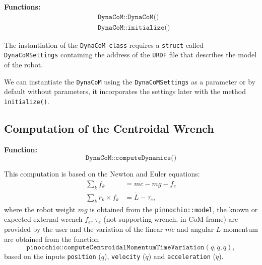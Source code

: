 \documentclass[12pt]{article}
\begin{document}
    {\bf Functions:}
    \begin{align*}
        &\texttt{DynaCoM::DynaCoM()}\\
        &\texttt{DynaCoM::initialize()}
    \end{align*}

    The instantiation of the \texttt{DynaCoM class} requires a \texttt{struct} called \texttt{DynaCoMSettings} containing the address of the \texttt{URDF} file that describes the model of the robot.

    We can instantiate the \texttt{DynaCoM} using the \texttt{DynaCoMSettings} as a parameter or by default without parameters, it incorporates the settings later with the method \texttt{initialize()}.
    



\clearpage

\subsection{Computation of the Centroidal Wrench}

\hrulefill

{\bf Function:}
%
\begin{equation*}
    \texttt{DynaCoM::computeDynamics()}
\end{equation*}

This computation is based on the Newton and Euler equations:
%
\begin{align}
    \sum_k f_k &= m\ddot{c} - m g - f_e \\
    \sum_k r_k\times f_k &= \dot{L} -\tau_e,
\end{align}
%
where the robot weight $m g$ is obtained from the \texttt{pinnochio::model}, the known or expected external wrench $f_e$, $\tau_e$ (not supporting wrench, in CoM frame) are provided by the user and the variation of the linear $m\ddot{c}$ and angular $\dot{L}$ momentum are obtained from the function 
%
\begin{equation*}
    \texttt{pinocchio::computeCentroidalMomentumTimeVariation}(q, \dot{q}, \ddot{q}),
\end{equation*}
%
based on the inputs \texttt{position} ($q$), \texttt{velocity} ($\dot{q}$) and \texttt{acceleration} ($\ddot{q}$).
\end{document}
